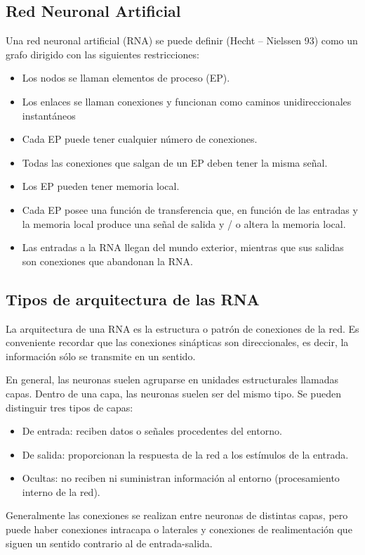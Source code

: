 \documentclass[12pt]{book} %
\begin{document}
		\subsection{Red Neuronal Artificial} 
			Una red neuronal artificial (RNA) se puede definir (Hecht – Nielssen 93) como un grafo dirigido con las siguientes restricciones:	
			\begin{multicols}{2}
			 \begin{itemize}
			 	\item Los nodos se llaman elementos de proceso (EP).
			    \item Los enlaces se llaman conexiones y funcionan como caminos unidireccionales instantáneos
			    \item Cada EP puede tener cualquier número de conexiones.
			    \item Todas las conexiones que salgan de un EP deben tener la misma señal.
			    \item Los EP pueden tener memoria local.
			    \item Cada EP posee una función de transferencia que, en función de las entradas y la memoria local produce una señal de salida 
			    y / o altera la memoria local.
				\item Las entradas a la RNA llegan del mundo exterior, mientras que sus salidas son conexiones que abandonan la RNA.

			 \end{itemize}
			 \end{multicols}
		\subsection{Tipos de arquitectura de las RNA}
			 La arquitectura de una RNA es la estructura o patrón de conexiones de la red. Es conveniente recordar que las conexiones sinápticas son
			 direccionales, es decir, la información sólo se transmite en un sentido.
			 
			En general, las neuronas suelen agruparse en unidades estructurales llamadas capas. Dentro de una capa, las neuronas suelen ser del mismo 
			tipo. Se pueden distinguir tres tipos de capas:
			\begin{multicols}{2}
				\begin{itemize}
			 		\item De entrada: reciben datos o señales procedentes del entorno.
			 	   \item De salida: proporcionan la respuesta de la red a los estímulos de la entrada.
			   	 \item Ocultas: no reciben ni suministran información al entorno (procesamiento interno de la red).
			 	\end{itemize}
			\end{multicols}
			Generalmente las conexiones se realizan entre neuronas de distintas capas, pero puede haber conexiones intracapa o laterales y conexiones de
			realimentación que siguen un sentido contrario al de entrada-salida.
			
\end{document}
